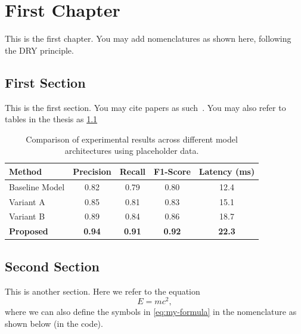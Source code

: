 \chapter{First Chapter}
\label{sec:chapter_1}

This is the first chapter. You may add nomenclatures as shown here, following the DRY principle.


\section{First Section}
\label{sec:chapter_1-1}

This is the first section. You may cite papers as such~\cite{Newton:1687eqk}. You may also refer to tables in the thesis as \cref{tab:placeholder_data}


\begin{table}
	\centering
	\caption{Comparison of experimental results across different model architectures using placeholder data.}
	\label{tab:placeholder_data}
	\begin{tabular}{lcccc}
		\toprule
		\textbf{Method}   & \textbf{Precision} & \textbf{Recall} & \textbf{F1-Score} & \textbf{Latency (ms)} \\
		\midrule
		Baseline Model    & 0.82               & 0.79            & 0.80              & 12.4                  \\
		Variant A         & 0.85               & 0.81            & 0.83              & 15.1                  \\
		Variant B         & 0.89               & 0.84            & 0.86              & 18.7                  \\
		\textbf{Proposed} & \textbf{0.94}      & \textbf{0.91}   & \textbf{0.92}     & \textbf{22.3}         \\
		\bottomrule
	\end{tabular}
\end{table}


\section{Second Section}
\label{sec:chapter_1-2}

This is another section. Here we refer to the equation
\begin{equation}
	E = mc^2 ,
	\label{eq:my-formula}
\end{equation}
where we can also define the symbols in \cref{eq:my-formula} in the nomenclature as shown below (in the code).

